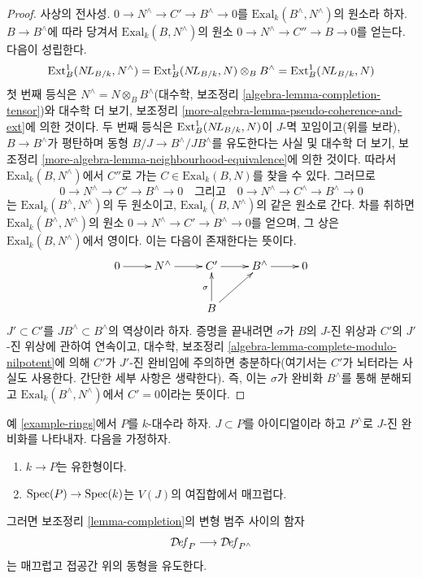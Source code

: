 \begin{proof}
\medskip\noindent
사상의 전사성. $0 \to N^\wedge \to C' \to B^\wedge \to 0$를
$\text{Exal}_k(B^\wedge, N^\wedge)$의 원소라 하자. $B \to B^\wedge$에
따라 당겨서 $\text{Exal}_k(B, N^\wedge)$의 원소
$0 \to N^\wedge \to C'' \to B \to 0$를 얻는다. 다음이 성립한다.%
$$
\text{Ext}^1_B(\mathop{N\!L}\nolimits_{B/k}, N^\wedge) =
\text{Ext}^1_B(\mathop{N\!L}\nolimits_{B/k}, N) \otimes_B B^\wedge =
\text{Ext}^1_B(\mathop{N\!L}\nolimits_{B/k}, N)
$$
첫 번째 등식은 $N^\wedge = N \otimes_B B^\wedge$(대수학, 보조정리
\ref{algebra-lemma-completion-tensor})와 대수학 더 보기, 보조정리
\ref{more-algebra-lemma-pseudo-coherence-and-ext}에 의한 것이다. 두 번째
등식은 $\text{Ext}^1_B(\mathop{N\!L}\nolimits_{B/k}, N)$이 $J$-멱 꼬임이고(위를 보라),
$B \to B^\wedge$가 평탄하며 동형 $B/J \to B^\wedge/JB^\wedge$를
유도한다는 사실 및 대수학 더 보기, 보조정리
\ref{more-algebra-lemma-neighbourhood-equivalence}에 의한 것이다. 따라서
$\text{Exal}_k(B, N^\wedge)$에서 $C''$로 가는
$C \in \text{Exal}_k(B, N)$를 찾을 수 있다. 그러므로
$$
0 \to N^\wedge \to C' \to B^\wedge \to 0
\quad\text{그리고}\quad
0 \to N^\wedge \to C^\wedge \to B^\wedge \to 0
$$
는 $\text{Exal}_k(B^\wedge, N^\wedge)$의 두 원소이고,
$\text{Exal}_k(B, N^\wedge)$의 같은 원소로 간다. 차를 취하면
$\text{Exal}_k(B^\wedge, N^\wedge)$의 원소
$0 \to N^\wedge \to C' \to B^\wedge \to 0$를 얻으며, 그 상은
$\text{Exal}_k(B, N^\wedge)$에서 영이다. 이는 다음이 존재한다는 뜻이다.
$$
\xymatrix{
0 \ar[r] &
N^\wedge \ar[r] &
C' \ar[r] &
B^\wedge \ar[r] & 0 \\
& & B \ar[u]^\sigma \ar[ru]
}
$$
$J' \subset C'$를 $JB^\wedge \subset B^\wedge$의 역상이라 하자. 증명을
끝내려면 $\sigma$가 $B$의 $J$-진 위상과 $C'$의 $J'$-진 위상에 관하여
연속이고, 대수학, 보조정리
\ref{algebra-lemma-complete-modulo-nilpotent}에 의해 $C'$가 $J'$-진
완비임에 주의하면 충분하다(여기서는 $C'$가 뇌터라는 사실도 사용한다.
간단한 세부 사항은 생략한다). 즉, 이는 $\sigma$가 완비화 $B^\wedge$를
통해 분해되고 $\text{Exal}_k(B^\wedge, N^\wedge)$에서 $C' = 0$이라는
뜻이다.
\end{proof}

\begin{lemma}
\label{lemma-smooth-completion}
예 \ref{example-rings}에서 $P$를 $k$-대수라 하자. $J \subset P$를
아이디얼이라 하고 $P^\wedge$로 $J$-진 완비화를 나타내자. 다음을 가정하자.
\begin{enumerate}
\item $k \to P$는 유한형이다.
\item $\mathop{\mathrm{Spec}}(P) \to \mathop{\mathrm{Spec}}(k)$는 $V(J)$의 여집합에서 매끄럽다.
\end{enumerate}
그러면 보조정리 \ref{lemma-completion}의 변형 범주 사이의 함자
$$
\mathcal{D}\!\mathit{ef}_P \longrightarrow \mathcal{D}\!\mathit{ef}_{P^\wedge}
$$
는 매끄럽고 접공간 위의 동형을 유도한다.
\end{lemma}

